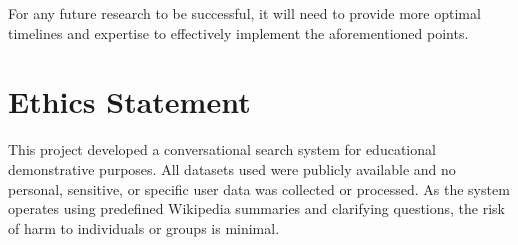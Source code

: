 \documentclass[11pt]{article}
\begin{document}
For any future research to be successful, it will need to provide more optimal timelines and expertise to effectively implement the aforementioned points.


\section*{Ethics Statement}
This project developed a conversational search system for educational demonstrative purposes. All datasets used were publicly available and no personal, sensitive, or specific user data was collected or processed. As the system operates using predefined Wikipedia summaries and clarifying questions, the risk of harm to individuals or groups is minimal. 



\end{document}
